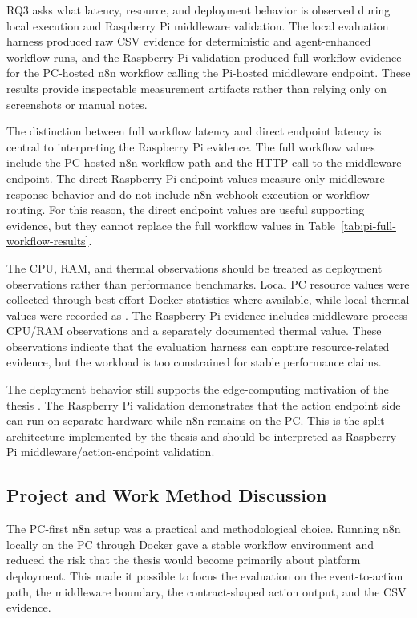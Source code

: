 RQ3 asks what latency, resource, and deployment behavior is observed during local execution and Raspberry Pi middleware validation. The local evaluation harness produced raw CSV evidence for deterministic and agent-enhanced workflow runs, and the Raspberry Pi validation produced full-workflow evidence for the PC-hosted n8n workflow calling the Pi-hosted middleware endpoint. These results provide inspectable measurement artifacts rather than relying only on screenshots or manual notes.

The distinction between full workflow latency and direct endpoint latency is central to interpreting the Raspberry Pi evidence. The full workflow values include the PC-hosted n8n workflow path and the HTTP call to the middleware endpoint. The direct Raspberry Pi endpoint values measure only middleware response behavior and do not include n8n webhook execution or workflow routing. For this reason, the direct endpoint values are useful supporting evidence, but they cannot replace the full workflow values in Table~\ref{tab:pi-full-workflow-results}.

The CPU, RAM, and thermal observations should be treated as deployment observations rather than performance benchmarks. Local PC resource values were collected through best-effort Docker statistics where available, while local thermal values were recorded as . The Raspberry Pi evidence includes middleware process CPU/RAM observations and a separately documented thermal value. These observations indicate that the evaluation harness can capture resource-related evidence, but the workload is too constrained for stable performance claims.

The deployment behavior still supports the edge-computing motivation of the thesis \cite{edgeComputingSatyanarayanan,iotSurveyAtzori}. The Raspberry Pi validation demonstrates that the action endpoint side can run on separate hardware while n8n remains on the PC. This is the split architecture implemented by the thesis and should be interpreted as Raspberry Pi middleware/action-endpoint validation.

\subsection{Project and Work Method Discussion}\label{subsec:discussion-project-work-method}

The PC-first n8n setup was a practical and methodological choice. Running n8n locally on the PC through Docker gave a stable workflow environment and reduced the risk that the thesis would become primarily about platform deployment. This made it possible to focus the evaluation on the event-to-action path, the middleware boundary, the contract-shaped action output, and the CSV evidence.

